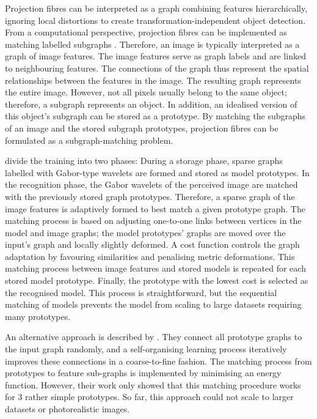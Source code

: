 Projection fibres can be interpreted as a graph combining features hierarchically, ignoring local distortions to create transformation-independent object detection.
From a computational perspective, projection fibres can be implemented as matching labelled subgraphs \cite{bienenstock_neural_1987, lades_distortion_1993, wiskott_face_1996}.
Therefore, an image is typically interpreted as a graph of image features. The image features serve as graph labels and are linked to neighbouring features. The connections of the graph thus represent the spatial relationships between the features in the image.
The resulting graph represents the entire image. However, not all pixels usually belong to the same object; therefore, a subgraph represents an object.
In addition, an idealised version of this object's subgraph can be stored as a prototype.
By matching the subgraphs of an image and the stored subgraph prototypes, projection fibres can be formulated as a subgraph-matching problem.

 divide the training into two phases: During a storage phase, sparse graphs labelled with Gabor-type wavelets are formed and stored as model prototypes. In the recognition phase, the Gabor wavelets of the perceived image are matched with the previously stored graph prototypes.
Therefore, a sparse graph of the image features is adaptively formed to best match a given prototype graph. The matching process is based on adjusting one-to-one links between vertices in the model and image graphs; the model prototypes' graphs are moved over the input's graph and locally slightly deformed. A cost function controls the graph adaptation by favouring similarities and penalising metric deformations. This matching process between image features and stored models is repeated for each stored model prototype. Finally, the prototype with the lowest cost is selected as the recognised model. This process is straightforward, but the sequential matching of models prevents the model from scaling to large datasets requiring many prototypes.

An alternative approach is described by . They connect all prototype graphs to the input graph randomly, and a self-organising learning process iteratively improves these connections in a coarse-to-fine fashion.
The matching process from prototypes to feature sub-graphs is implemented by minimising an energy function.
However, their work only showed that this matching procedure works for $3$ rather simple prototypes.
So far, this approach could not scale to larger datasets or photorealistic images.

